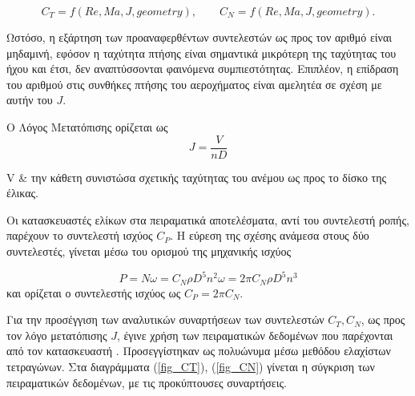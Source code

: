 \begin{equation*}
    C_T = \mathit{f}(Re, Ma, J, geometry), \qquad C_N = \mathit{f}(Re, Ma, J, 
    geometry).
\end{equation*}

Ωστόσο, η εξάρτηση των προαναφερθέντων συντελεστών ως προς τον αριθμό 
είναι μηδαμινή, εφόσον η ταχύτητα πτήσης είναι σημαντικά μικρότερη της ταχύτητας
του ήχου και έτσι, δεν αναπτύσσονται φαινόμενα συμπιεστότητας. Επιπλέον, η 
επίδραση του αριθμού  στις συνθήκες πτήσης του αεροχήματος είναι
αμελητέα σε σχέση με αυτήν του \(J\).

Ο Λόγος Μετατόπισης ορίζεται ως
\begin{equation*}
    J = \frac{V}{n D}
\end{equation*}
\begin{conditions}
    V & την κάθετη συνιστώσα σχετικής ταχύτητας του ανέμου ως προς το δίσκο της 
    έλικας.
\end{conditions}

Οι κατασκευαστές ελίκων στα πειραματικά αποτελέσματα, αντί του συντελεστή 
ροπής, παρέχουν το συντελεστή ισχύος \(C_P\). Η εύρεση της σχέσης ανάμεσα στους 
δύο συντελεστές, γίνεται μέσω του ορισμού της μηχανικής ισχύος

\begin{equation*}
    P = N \omega = C_N \rho D^5 n^2 \omega = 2 \pi C_N \rho D^5 n^3
\end{equation*}
και ορίζεται ο συντελεστής ισχύος ως \(C_P = 2 \pi C_N \).

Για την προσέγγιση των αναλυτικών συναρτήσεων των συντελεστών \(C_T, C_N\), ως 
προς τον λόγο μετατόπισης \(J\), έγινε χρήση των πειραματικών δεδομένων που 
παρέχονται από τον κατασκευαστή \cite{APC_data}. Προσεγγίστηκαν ως πολυώνυμα 
μέσω μεθόδου ελαχίστων τετραγώνων. Στα διαγράμματα (\ref{fig_CT}), 
(\ref{fig_CN}) γίνεται η σύγκριση των πειραματικών δεδομένων, με τις 
προκύπτουσες συναρτήσεις.

